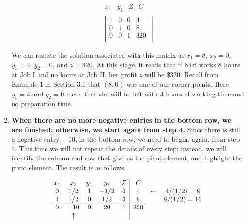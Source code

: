 \begin{solution}
\begin{enumerate}
              \[
                  \begin{array}{c}
                      \begin{array}{cccc}
                          x_1 & y_1 & Z & C
                      \end{array} \\
                      \left[
                          \begin{array}{ccc|c}
                              1 & 0 & 0 & 4   \\
                              0 & 1 & 0 & 8   \\
                              0 & 0 & 1 & 320 \\
                          \end{array}
                          \right]
                  \end{array}
              \]

              We can restate the solution associated with this matrix as $x_1 = 8$, $x_2 = 0$, $y_1 = 4$, $y_2 = 0$, and $z = 320$. At this stage, it reads that if Niki works 8 hours at Job I and no hours at Job II, her profit $z$ will be \$320. Recall from Example 1 in Section 3.1 that $(8, 0)$ was one of our corner points. Here $y_1 = 4$ and $y_2 = 0$ mean that she will be left with 4 hours of working time and no preparation time.
        \item \textbf{When there are no more negative entries in the bottom row, we are finished; otherwise, we start again from step 4.}
              Since there is still a negative entry, $-10$, in the bottom row, we need to begin, again, from step 4. This time we will not repeat the details of every step; instead, we will identify the column and row that give us the pivot element, and highlight the pivot element. The result is as follows.

              \[
                  \begin{array}{ccccc|ccc}

                      x_1 & x_2      & y_1 & y_2  & Z & C   &            &              \\

                      0   & 1/2      & 1   & -1/2 & 0 & 4   & \leftarrow & 4/(1/2) = 8  \\
                      1   & 1/2      & 0   & 1/2  & 0 & 8   &            & 8/(1/2) = 16 \\
                      \cline{1-6}
                      0   & -10      & 0   & 20   & 1 & 320 &            &              \\
                          & \uparrow &     &      &   &     &            &
                  \end{array}
              \]


\end{enumerate}
\end{solution}
